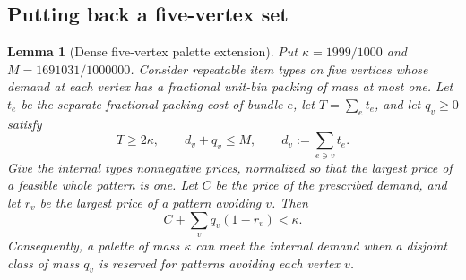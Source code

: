 \documentclass[11pt]{article}
\newtheorem{lemma}[theorem]{Lemma}
\theoremstyle{definition}\newtheorem{algorithm}{Algorithm}[section]
\numberwithin{equation}{section}
\theoremstyle{remark}\newtheorem*{remark}{Remark}
\begin{document}
\subsection{Putting back a five-vertex set}

\begin{lemma}[Dense five-vertex palette extension]
\label{lem:subtwo-five}
Put $\kappa=1999/1000$ and $M=1691031/1000000$.
Consider repeatable item types on five vertices whose demand at each
vertex has a fractional unit-bin packing of mass at most one.
Let $t_e$ be the separate fractional packing cost of bundle $e$, let
$T=\sum_e t_e$, and let $q_v\ge0$ satisfy
\begin{equation}\label{eq:subtwo-five-hypotheses}
 T\ge2\kappa,\qquad d_v+q_v\le M,
 \qquad d_v:=\sum_{e\ni v}t_e.
\end{equation}
Give the internal types nonnegative prices, normalized so that the
largest price of a feasible whole pattern is one. Let $C$ be the
price of the prescribed demand, and let $r_v$ be the largest price
of a pattern avoiding $v$. Then
\begin{equation}\label{eq:subtwo-five-dual}
 C+\sum_vq_v(1-r_v)<\kappa.
\end{equation}
Consequently, a palette of mass $\kappa$ can meet the internal demand
when a disjoint class of mass $q_v$ is reserved for patterns avoiding
each vertex $v$.
\end{lemma}
\end{document}
